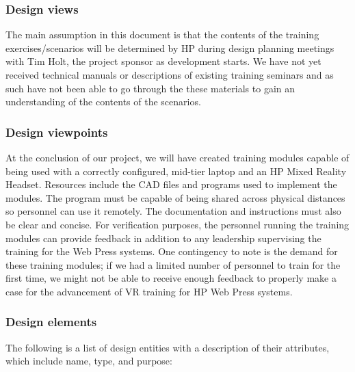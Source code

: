 \documentclass[onecolumn, draftclsnofoot,10pt, compsoc]{IEEEtran}
\begin{document}
\subsubsection{Design views}
The main assumption in this document is that the contents of the training exercises/scenarios will be determined by HP during design planning meetings with Tim Holt, the project sponsor as development starts. We have not yet received technical manuals or descriptions of existing training seminars and as such have not been able to go through the these materials to gain an understanding of the contents of the scenarios.
\subsubsection{Design viewpoints}
At the conclusion of our project, we will have created training modules capable of being used with a correctly configured, mid-tier laptop and an HP Mixed Reality Headset. Resources include the CAD files and programs used to implement the modules. The program must be capable of being shared across physical distances so personnel can use it remotely. The documentation and instructions must also be clear and concise. For verification purposes, the personnel running the training modules can provide feedback in addition to any leadership supervising the training for the Web Press systems. One contingency to note is the demand for these training modules; if we had a limited number of personnel to train for the first time, we might not be able to receive enough feedback to properly make a case for the advancement of VR training for HP Web Press systems. 
\newpage

\subsubsection{Design elements}
The following is a list of design entities with a description of their attributes, which include name, type, and purpose:
\end{document}
